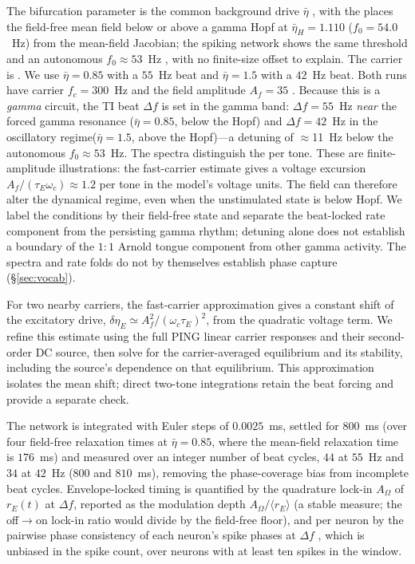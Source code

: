 \documentclass[11pt,a4paper]{article}
\providecommand{\DIFaddtex}[1]{{\protect\color{blue} \sf #1}} %
\providecommand{\DIFdeltex}[1]{{\protect\color{red} \scriptsize #1}} %
\providecommand{\DIFaddbegin}{} %
\providecommand{\DIFaddend}{} %
\providecommand{\DIFdelbegin}{} %
\providecommand{\DIFdelend}{} %
\providecommand{\DIFadd}[1]{\texorpdfstring{\DIFaddtex{#1}}{#1}} %
\providecommand{\DIFdel}[1]{\texorpdfstring{\DIFdeltex{#1}}{}} %
\begin{document}
The \DIFdelbegin \DIFdel{bifurcation parameter is the }\DIFdelend common background drive $\bar\eta$ \DIFdelbegin \DIFdel{, with the }\DIFdelend \DIFaddbegin \DIFadd{places the field-free mean field below or
above a }\DIFaddend gamma Hopf at $\bar\eta_H=1.110$ ($f_0=54.0$~Hz)\DIFdelbegin \DIFdel{from the mean-field Jacobian; the spiking network shows the same threshold and an
autonomous $f_0\!\approx\!53$~Hz , with no finite-size offset to explain.
The carrier is
}\DIFdelend \DIFaddbegin \DIFadd{. We use
$\bar\eta=0.85$ with a $55$~Hz beat and $\bar\eta=1.5$ with a $42$~Hz beat.
Both runs have carrier }\DIFaddend $f_c=300$~Hz and \DIFdelbegin \DIFdel{the field }\DIFdelend amplitude $A_f=35$ \DIFdelbegin \DIFdel{. Because
this is a \emph{gamma} circuit, the TI beat $\Delta f$ is set in the gamma band: $\Delta f=55$~Hz \emph{near} the forced gamma resonance ($\bar\eta=0.85$, below the Hopf) and
$\Delta f=42$~Hz in the oscillatory regime($\bar\eta=1.5$, above the Hopf)---a detuning of
$\approx$11~Hz below
the autonomous $f_0\!\approx\!53$~Hz. The spectra distinguish
the }\DIFdelend \DIFaddbegin \DIFadd{per tone. These are
finite-amplitude illustrations: the fast-carrier estimate gives a voltage excursion
$A_f/(\tau_E\omega_c)\approx1.2$ per tone in the model's voltage units. The field
can therefore alter the dynamical regime, even when the unstimulated state is below
Hopf. We label the conditions by their field-free state and separate the }\DIFaddend beat-locked
\DIFdelbegin \DIFdel{rate component from the persisting gamma rhythm; detuning alone
does not establish a boundary of the $1{:}1$ Arnold tongue }\DIFdelend \DIFaddbegin \DIFadd{component from other gamma activity. The spectra and rate folds do not by themselves
establish phase capture }\DIFaddend (\S\ref{sec:vocab}).

\DIFaddbegin \DIFadd{For two nearby carriers, the fast-carrier approximation gives a constant shift
of the excitatory drive, $\delta\eta_E\simeq A_f^2/(\omega_c\tau_E)^2$, from the
quadratic voltage term. We refine this estimate using the full PING linear carrier
responses and their second-order DC source, then solve for the carrier-averaged
equilibrium and its stability, including the source's dependence on that equilibrium.
This approximation isolates the mean shift; direct two-tone integrations retain
the beat forcing and provide a separate check.
}

\DIFaddend The network is integrated with Euler steps of $0.0025$~ms, settled for $800$~ms (over
four \DIFaddbegin \DIFadd{field-free }\DIFaddend relaxation times at $\bar\eta=0.85$, where the mean-field relaxation time is
$176$~ms) and measured over an integer number of beat cycles, $44$ at $55$~Hz and $34$ at
$42$~Hz ($800$ and $810$~ms), removing the phase-coverage bias from incomplete
beat cycles. Envelope-locked timing is quantified by the quadrature lock-in $A_\Omega$ of
$r_E(t)$ at $\Delta f$, reported as the modulation depth $A_\Omega/\langle r_E\rangle$ (a
stable measure; the off$\to$on lock-in ratio would divide by the field-free floor), and
per neuron by the pairwise phase consistency of each neuron's spike phases at $\Delta f$
\cite{vinck2010}, which is unbiased in the spike count, over neurons with at least ten
spikes in the window.
\end{document}
